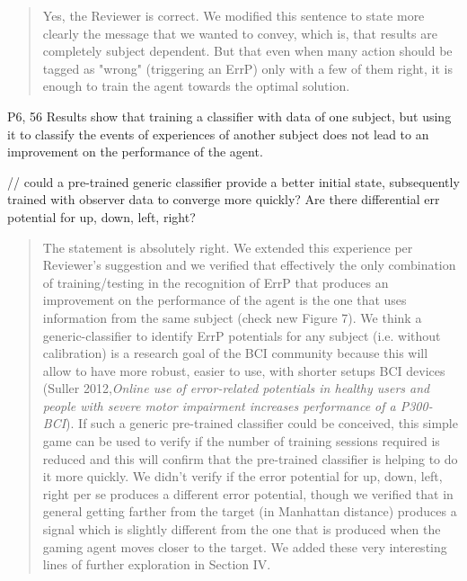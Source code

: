 \documentclass[journal,onecolumn,12pt]{IEEEtran}
\begin{document}
\vspace{2em}
\begin{quotation}
{\color{blue}
Yes, the Reviewer is correct.  We modified this sentence to state more clearly the message that we wanted to convey, which is, that results are completely subject dependent.  But that even when many action should be tagged as "wrong" (triggering an ErrP) only with a few of them right, it is enough to train the agent towards the optimal solution.
}
\end{quotation}
\vspace{2em}

P6, 56
Results show that training a classifier with data of one subject, but using it
to classify the events of experiences of another subject does
not lead to an improvement on the performance of the agent.

// could a pre-trained generic classifier provide a better initial state, subsequently trained with observer data to converge more quickly?
Are there differential err potential for up, down, left, right?

\vspace{2em}
\begin{quotation}
{\color{blue}
The statement is absolutely right.  We extended this experience per Reviewer's suggestion and we verified that effectively the only combination of training/testing in the recognition of ErrP that produces an improvement on the performance of the agent is the one that uses information from the same subject (check new Figure 7).   We think a generic-classifier to identify ErrP potentials for any subject (i.e. without calibration) is a research goal of the BCI community because this will allow to have more robust, easier to use, with shorter setups  BCI devices (Suller 2012,\textit{Online use of error-related potentials in healthy users and people with severe motor impairment increases performance of a P300-BCI}).  If such a generic pre-trained classifier could be conceived, this simple game can be used to verify if the number of training sessions required is reduced and this will confirm that the pre-trained classifier is helping to do it more quickly.  We didn't verify if the error potential for up, down, left, right per se produces a different error potential, though we verified that in general getting farther from the target (in Manhattan distance) produces a signal which is slightly different from the one that is produced when the gaming agent moves closer to the target.  We added these very interesting lines of further exploration in Section IV.
}
\end{quotation}
\vspace{2em}
\end{document}
